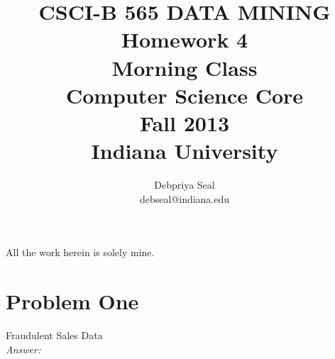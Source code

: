 \documentclass{article}
\begin{document}
\title{ CSCI-B 565 DATA MINING \\
Homework 4 \\
Morning Class\\
Computer Science Core\\Fall 2013\\Indiana University}
\author{ Debpriya Seal\\ debseal@indiana.edu}
\maketitle
All the work herein is solely mine. \\

\section*{Problem One}
		Fraudulent Sales Data\\
	\emph{Answer:} 
\end{document}
